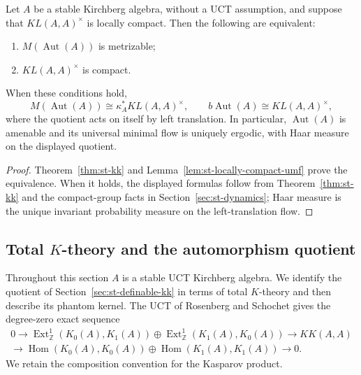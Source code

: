 \begin{corollary}\label{cor:st-locally-compact-kl}
 Let $A$ be a stable Kirchberg algebra,
without a UCT assumption, and suppose that $KL(A,A)^\times$ is locally
compact. Then the following are equivalent:

\begin{enumerate}
\item $M(\operatorname{Aut}(A))$ is metrizable;

\item $KL(A,A)^\times$ is compact.
\end{enumerate}

When these conditions hold, 
\begin{equation*}
M(\operatorname{Aut}(A))\cong\kappa_A^*KL(A,A)^\times,  \qquad b\operatorname{Aut}(A)\cong
KL(A,A)^\times, 
\end{equation*}
where the quotient acts on itself by left translation. In particular, $\operatorname{Aut} (A)$ is amenable and its universal minimal flow is uniquely ergodic, with
Haar measure on the displayed quotient.
\end{corollary}

\begin{proof}
Theorem~\ref{thm:st-kk} and Lemma~\ref{lem:st-locally-compact-umf} prove the
equivalence. When it holds, the displayed formulas follow from Theorem~\ref{thm:st-kk} and the compact-group facts in Section~\ref{sec:st-dynamics}; Haar measure is the unique invariant
probability measure on the left-translation flow.
\end{proof}


\subsection{Total \(K\)-theory and the automorphism quotient}

\label{sec:st-total} Throughout this section $A$ is a stable UCT Kirchberg
algebra. We identify the quotient of Section~\ref{sec:st-definable-kk} in terms
of total $K$-theory and then describe its phantom kernel. The UCT of
Rosenberg and Schochet \cite{RosenbergSchochet1987} gives the degree-zero exact sequence 
\begin{equation}  \label{eq:st-uct}
\begin{split}
0\longrightarrow \operatorname{Ext}^1_\mathbb{Z}(K_0(A),K_1(A))\oplus \operatorname{Ext}^1_\mathbb{Z}(K_1(A),K_0(A)) \longrightarrow KK(A,A) \\
\longrightarrow \operatorname{Hom}(K_0(A),K_0(A))\oplus \operatorname{Hom}(K_1(A),K_1(A))
\longrightarrow0.
\end{split}\end{equation}
We retain the composition convention for the Kasparov product.

